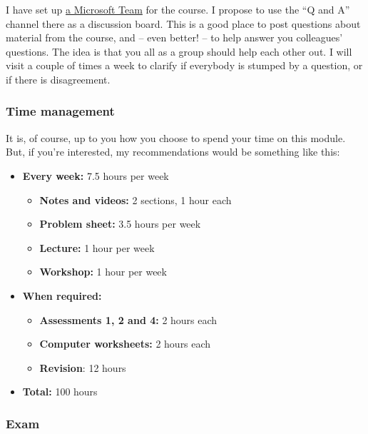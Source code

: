 \documentclass[
  a4paper,
]{article}
\providecommand{\tightlist}{%
  \setlength{\itemsep}{0pt}\setlength{\parskip}{0pt}}
\theoremstyle{definition}
\theoremstyle{definition}
\theoremstyle{definition}
\theoremstyle{remark}
\begin{document}
I have set up \href{https://teams.microsoft.com/l/channel/19\%3a8cb8008c95204bbeaefa8ee7d48c1a13\%40thread.tacv2/General?groupId=1c138eac-0c54-43b0-9d20-d4cf3d65c40a\&tenantId=bdeaeda8-c81d-45ce-863e-5232a535b7cb}{a Microsoft Team} for the course. I propose to use the ``Q and A'' channel there as a discussion board. This is a good place to post questions about material from the course, and -- even better! -- to help answer you colleagues' questions. The idea is that you all as a group should help each other out. I will visit a couple of times a week to clarify if everybody is stumped by a question, or if there is disagreement.

\hypertarget{time}{%
\subsubsection*{Time management}\label{time}}

It is, of course, up to you how you choose to spend your time on this module. But, if you're interested, my recommendations would be something like this:

\begin{itemize}
\tightlist
\item
  \textbf{Every week:} 7.5 hours per week

  \begin{itemize}
  \tightlist
  \item
    \textbf{Notes and videos:} 2 sections, 1 hour each
  \item
    \textbf{Problem sheet:} 3.5 hours per week
  \item
    \textbf{Lecture:} 1 hour per week
  \item
    \textbf{Workshop:} 1 hour per week
  \end{itemize}
\item
  \textbf{When required:}

  \begin{itemize}
  \tightlist
  \item
    \textbf{Assessments 1, 2 and 4:} 2 hours each
  \item
    \textbf{Computer worksheets:} 2 hours each
  \item
    \textbf{Revision}: 12 hours
  \end{itemize}
\item
  \textbf{Total:} 100 hours
\end{itemize}

\hypertarget{exam}{%
\subsubsection*{Exam}\label{exam}}
\end{document}
